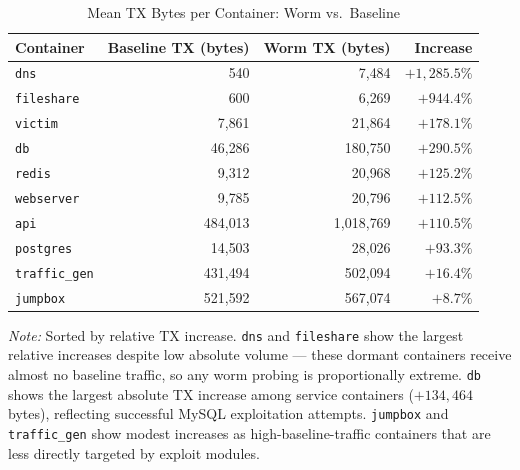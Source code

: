\begin{table}[ht]
\centering
\caption{Mean TX Bytes per Container: Worm vs.\ Baseline}
\label{tab:per_container}
\begin{tabular}{lrrr}
\toprule
\textbf{Container} & \textbf{Baseline TX (bytes)} & \textbf{Worm TX (bytes)} & \textbf{Increase} \\
\midrule
\texttt{dns}         &       540 &    7{,}484 & $+1{,}285.5\%$ \\
\texttt{fileshare}   &       600 &    6{,}269 & $+944.4\%$  \\
\texttt{victim}      &    7{,}861 &   21{,}864 & $+178.1\%$  \\
\texttt{db}          &   46{,}286 &  180{,}750 & $+290.5\%$  \\
\texttt{redis}       &    9{,}312 &   20{,}968 & $+125.2\%$  \\
\texttt{webserver}   &    9{,}785 &   20{,}796 & $+112.5\%$  \\
\texttt{api}         &  484{,}013 & 1{,}018{,}769 & $+110.5\%$ \\
\texttt{postgres}    &   14{,}503 &   28{,}026 & $+93.3\%$   \\
\texttt{traffic\_gen}& 431{,}494 &  502{,}094 & $+16.4\%$   \\
\texttt{jumpbox}     & 521{,}592 &  567{,}074 & $+8.7\%$    \\
\bottomrule
\end{tabular}
\begin{minipage}{\linewidth}
\vspace{4pt}
\small
\textit{Note:} Sorted by relative TX increase. \texttt{dns} and \texttt{fileshare} show
the largest relative increases despite low absolute volume — these dormant containers
receive almost no baseline traffic, so any worm probing is proportionally extreme.
\texttt{db} shows the largest absolute TX increase among service containers
($+134{,}464$ bytes), reflecting successful MySQL exploitation attempts.
\texttt{jumpbox} and \texttt{traffic\_gen} show modest increases as high-baseline-traffic
containers that are less directly targeted by exploit modules.
\end{minipage}
\end{table}


